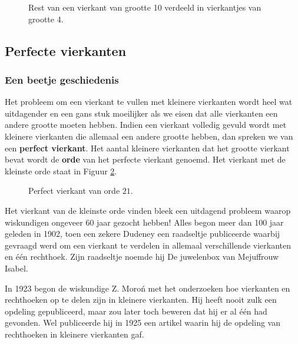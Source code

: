 

\begin{figure}[ht]
  \centering
  
  \caption{Rest van een vierkant van grootte 10 verdeeld in vierkantjes van grootte 4.}
  \label{fig:vierkant10_4x4}
\end{figure}

\newpage
\subsection{Perfecte vierkanten}

\subsubsection{Een beetje geschiedenis}

Het probleem om een vierkant te vullen met kleinere vierkanten wordt heel wat uitdagender en een gans stuk moeilijker als we eisen dat alle vierkanten een andere grootte moeten hebben. Indien een vierkant volledig gevuld wordt met kleinere vierkanten die allemaal een andere grootte hebben, dan spreken we van een {\bf perfect vierkant}. Het aantal kleinere vierkanten dat het grootte vierkant bevat wordt de {\bf orde} van het perfecte vierkant genoemd. Het vierkant met de kleinste orde staat in Figuur \ref{fig:pv21}.

\begin{figure}[ht]
  \centering
  
  \caption{Perfect vierkant van orde $21$.}
  \label{fig:pv21}
\end{figure}

Het vierkant van de kleinste orde vinden bleek een uitdagend probleem waarop wiskundigen ongeveer 60 jaar gezocht hebben! Alles begon meer dan 100 jaar geleden in 1902, toen een zekere  Dudeney een raadseltje publiceerde waarbij gevraagd werd om een vierkant te verdelen in allemaal verschillende vierkanten en \'e\'en rechthoek. Zijn raadseltje noemde hij De juwelenbox van Mejuffrouw Isabel.

In 1923 begon de wiskundige Z. Moro\'n met het onderzoeken hoe vierkanten en rechthoeken op te delen zijn in kleinere vierkanten. Hij heeft nooit zulk een opdeling gepubliceerd, maar zou later toch beweren dat hij er al \'e\'en had gevonden. Wel publiceerde hij in 1925 een artikel waarin hij de opdeling van rechthoeken in kleinere vierkanten gaf.

